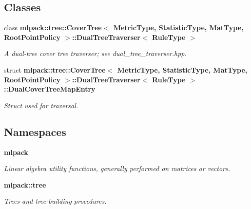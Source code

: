 \subsection*{Classes}
\begin{DoxyCompactItemize}
\item 
class {\bf mlpack\+::tree\+::\+Cover\+Tree$<$ Metric\+Type, Statistic\+Type, Mat\+Type, Root\+Point\+Policy $>$\+::\+Dual\+Tree\+Traverser$<$ Rule\+Type $>$}
\begin{DoxyCompactList}\small\item\em A dual-\/tree cover tree traverser; see dual\+\_\+tree\+\_\+traverser.\+hpp. \end{DoxyCompactList}\item 
struct {\bf mlpack\+::tree\+::\+Cover\+Tree$<$ Metric\+Type, Statistic\+Type, Mat\+Type, Root\+Point\+Policy $>$\+::\+Dual\+Tree\+Traverser$<$ Rule\+Type $>$\+::\+Dual\+Cover\+Tree\+Map\+Entry}
\begin{DoxyCompactList}\small\item\em Struct used for traversal. \end{DoxyCompactList}\end{DoxyCompactItemize}
\subsection*{Namespaces}
\begin{DoxyCompactItemize}
\item 
 {\bf mlpack}
\begin{DoxyCompactList}\small\item\em Linear algebra utility functions, generally performed on matrices or vectors. \end{DoxyCompactList}\item 
 {\bf mlpack\+::tree}
\begin{DoxyCompactList}\small\item\em Trees and tree-\/building procedures. \end{DoxyCompactList}\end{DoxyCompactItemize}
